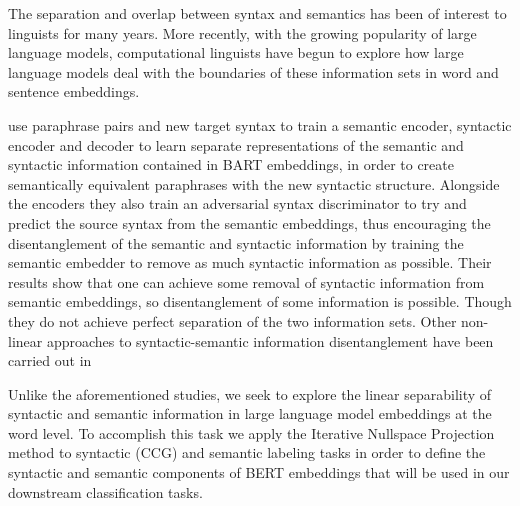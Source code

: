 \documentclass[11pt,a4paper]{article}
\begin{document}

The separation and overlap between syntax and semantics has been of interest to linguists for many years. More recently, with the growing popularity of large language models, computational linguists have begun to explore how large language models deal with the boundaries of these information sets in word and sentence embeddings. 

\citealp{disentangle} use paraphrase pairs and new target syntax to train a semantic encoder, syntactic encoder and decoder to learn separate representations of the semantic and syntactic information contained in BART embeddings, in order to create semantically equivalent paraphrases with the new syntactic structure. Alongside the encoders they also train an adversarial syntax discriminator to try and predict the source syntax from the semantic embeddings, thus encouraging the disentanglement of the semantic and syntactic information by training the semantic embedder to remove as much syntactic information as possible. Their results show that one can achieve some removal of syntactic information from semantic embeddings, so disentanglement of some information is possible. Though they do not achieve perfect separation of the two information sets. Other non-linear approaches to syntactic-semantic information disentanglement have been carried out in \citep{multiDis}


Unlike the aforementioned studies, we seek to explore the linear separability of syntactic and semantic information in large language model embeddings at the word level. To accomplish this task we apply the Iterative Nullspace Projection method to syntactic (CCG) and semantic labeling tasks in order to define the syntactic and semantic components of BERT embeddings that will be used in our downstream classification tasks. 
\end{document}
